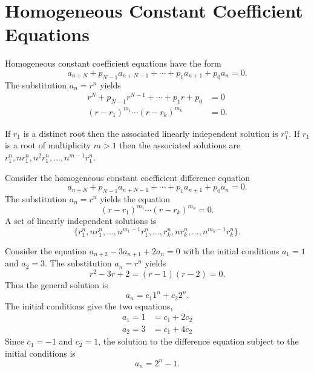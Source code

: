 \section{Homogeneous Constant Coefficient Equations}
Homogeneous constant coefficient equations have the form
\[ a_{n+N} + p_{N-1} a_{n+N-1} + \cdots + p_1 a_{n+1} + p_0 a_n = 0. \]
The substitution $a_n = r^n$ yields
\begin{align*}
  r^N + p_{N-1}r^{N-1} + \cdots + p_1 r + p_0 &= 0 \\
  (r-r_1)^{m_1}\cdots (r-r_k)^{m_k} &= 0.
\end{align*}

If $r_1$ is a distinct root then the associated linearly independent solution
is $r_1^n$.  If $r_1$ is a root of multiplicity $m > 1$ then the associated
solutions are $r_1^n, n r_1^n, n^2r_1^n, \ldots, n^{m-1} r_1^n$.



\begin{Result}
  Consider the homogeneous constant coefficient difference equation
  \[ a_{n+N} + p_{N-1} a_{n+N-1} + \cdots + p_1 a_{n+1} + p_0 a_n = 0. \]
  The substitution $a_n = r^n$ yields the equation
  \[(r-r_1)^{m_1}\cdots (r-r_k)^{m_k} = 0. \]
  A set of linearly independent solutions is
  \[ \{r_1^n, n r_1^n, \ldots, n^{m_1-1}r_1^n, \ldots, r_k^n, n r_k^n, \ldots,
  n^{m_k-1}r_k^n\}.\]
\end{Result}



\begin{Example}
  Consider the equation $a_{n+2} - 3a_{n+1} + 2a_n = 0$ with the initial 
  conditions $a_1 = 1$ and $a_2 = 3$.  The substitution $a_n = r^n$ yields
  \[      r^2 - 3r + 2 = (r-1)(r-2) = 0. \]
  Thus the general solution is
  \[      a_n = c_1 1^n + c_2 2^n. \]
  The initial conditions give the two equations,
  \begin{align*}
    a_1 = 1 &= c_1 + 2c_2  \\
    a_2 = 3 &= c_1 + 4c_2
  \end{align*}
  Since $c_1 = -1$ and $c_2 = 1$, the solution to the difference equation
  subject to the initial conditions is
  \[ a_n = 2^n - 1.\]
\end{Example}



